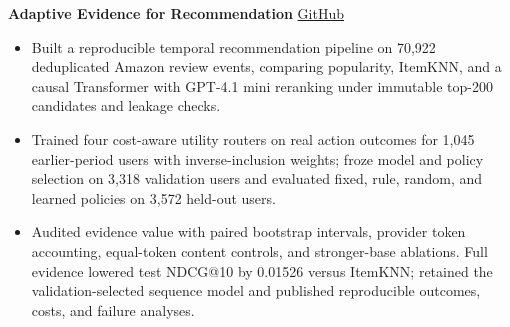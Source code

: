 \noindent\textbf{Adaptive Evidence for Recommendation}
\hfill\href{https://github.com/WItaZhang/agentic-rec}{GitHub}
\begin{itemize}
  \item Built a reproducible temporal recommendation pipeline on 70,922 deduplicated Amazon review events, comparing popularity, ItemKNN, and a causal Transformer with GPT-4.1 mini reranking under immutable top-200 candidates and leakage checks.
  \item Trained four cost-aware utility routers on real action outcomes for 1,045 earlier-period users with inverse-inclusion weights; froze model and policy selection on 3,318 validation users and evaluated fixed, rule, random, and learned policies on 3,572 held-out users.
  \item Audited evidence value with paired bootstrap intervals, provider token accounting, equal-token content controls, and stronger-base ablations. Full evidence lowered test NDCG@10 by 0.01526 versus ItemKNN; retained the validation-selected sequence model and published reproducible outcomes, costs, and failure analyses.
\end{itemize}
